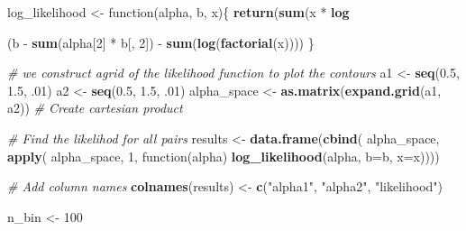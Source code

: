 \documentclass[]{article}
\newenvironment{Shaded}{\begin{snugshade}}{\end{snugshade}}
\newcommand{\KeywordTok}[1]{\textcolor[rgb]{0.13,0.29,0.53}{\textbf{{#1}}}}
\newcommand{\DataTypeTok}[1]{\textcolor[rgb]{0.13,0.29,0.53}{{#1}}}
\newcommand{\DecValTok}[1]{\textcolor[rgb]{0.00,0.00,0.81}{{#1}}}
\newcommand{\FloatTok}[1]{\textcolor[rgb]{0.00,0.00,0.81}{{#1}}}
\newcommand{\StringTok}[1]{\textcolor[rgb]{0.31,0.60,0.02}{{#1}}}
\newcommand{\CommentTok}[1]{\textcolor[rgb]{0.56,0.35,0.01}{\textit{{#1}}}}
\newcommand{\NormalTok}[1]{{#1}}
\begin{document}
\begin{Shaded}
\begin{Highlighting}[]
\NormalTok{log_likelihood <-}\StringTok{ }\NormalTok{function(alpha, b, x)\{}
  \KeywordTok{return}\NormalTok{(}\KeywordTok{sum}\NormalTok{(x *}\StringTok{ }\KeywordTok{log}\NormalTok{(b %
         \NormalTok{-}\StringTok{ }\KeywordTok{sum}\NormalTok{(alpha[}\DecValTok{2}\NormalTok{] *}\StringTok{ }\NormalTok{b[, }\DecValTok{2}\NormalTok{]) -}\StringTok{ }\KeywordTok{sum}\NormalTok{(}\KeywordTok{log}\NormalTok{(}\KeywordTok{factorial}\NormalTok{(x))))}
\NormalTok{\}}

\CommentTok{# we construct agrid of the likelihood function to plot the contours}
\NormalTok{a1 <-}\StringTok{ }\KeywordTok{seq}\NormalTok{(}\FloatTok{0.5}\NormalTok{, }\FloatTok{1.5}\NormalTok{, .}\DecValTok{01}\NormalTok{)}
\NormalTok{a2 <-}\StringTok{ }\KeywordTok{seq}\NormalTok{(}\FloatTok{0.5}\NormalTok{, }\FloatTok{1.5}\NormalTok{, .}\DecValTok{01}\NormalTok{)}
\NormalTok{alpha_space <-}\StringTok{ }\KeywordTok{as.matrix}\NormalTok{(}\KeywordTok{expand.grid}\NormalTok{(a1, a2)) }\CommentTok{# Create cartesian product}

\CommentTok{# Find the likelihod for all pairs}
\NormalTok{results <-}\StringTok{ }\KeywordTok{data.frame}\NormalTok{(}\KeywordTok{cbind}\NormalTok{(}
  \NormalTok{alpha_space, }\KeywordTok{apply}\NormalTok{(}
    \NormalTok{alpha_space, }\DecValTok{1}\NormalTok{, }
      \NormalTok{function(alpha) }\KeywordTok{log_likelihood}\NormalTok{(alpha, }\DataTypeTok{b=}\NormalTok{b, }\DataTypeTok{x=}\NormalTok{x))))}

\CommentTok{# Add column names}
\KeywordTok{colnames}\NormalTok{(results) <-}\StringTok{ }\KeywordTok{c}\NormalTok{(}\StringTok{"alpha1"}\NormalTok{, }\StringTok{"alpha2"}\NormalTok{, }\StringTok{"likelihood"}\NormalTok{) }

\NormalTok{n_bin <-}\StringTok{ }\DecValTok{100}


}
\end{Highlighting}
\end{Shaded}
\end{document}
